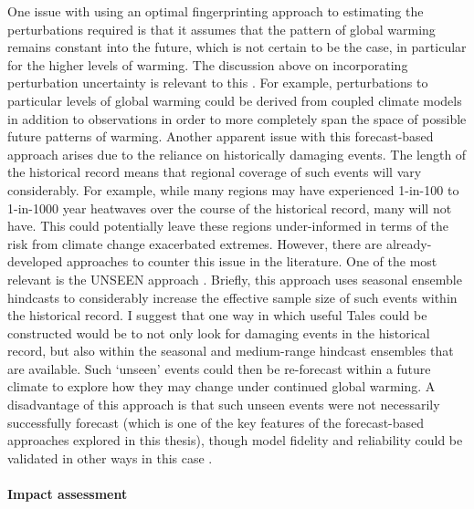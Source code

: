       One issue with using an optimal fingerprinting approach to estimating the perturbations required is that it assumes that the pattern of global warming remains constant into the future, which is not certain to be the case, in particular for the higher levels of warming. The discussion above on incorporating perturbation uncertainty is relevant to this \citep{zhou_greater_2021}. For example, perturbations to particular levels of global warming could be derived from coupled climate models in addition to observations in order to more completely span the space of possible future patterns of warming. Another apparent issue with this forecast-based approach arises due to the reliance on historically damaging events. The length of the historical record means that regional coverage of such events will vary considerably. For example, while many regions may have experienced 1-in-100 to 1-in-1000 year heatwaves over the course of the historical record, many will not have. This could potentially leave these regions under-informed in terms of the risk from climate change exacerbated extremes. However, there are already-developed approaches to counter this issue in the literature. One of the most relevant is the UNSEEN approach \citep{thompson_high_2017,kelder_using_2020}. Briefly, this approach uses seasonal ensemble hindcasts to considerably increase the effective sample size of such events within the historical record. I suggest that one way in which useful Tales could be constructed would be to not only look for damaging events in the historical record, but also within the seasonal and medium-range hindcast ensembles that are available. Such `unseen' events could then be re-forecast within a future climate to explore how they may change under continued global warming. A disadvantage of this approach is that such unseen events were not necessarily successfully forecast (which is one of the key features of the forecast-based approaches explored in this thesis), though model fidelity and reliability could be validated in other ways in this case \citep{kelder_interpreting_2022}.

    \paragraph*{Impact assessment}

